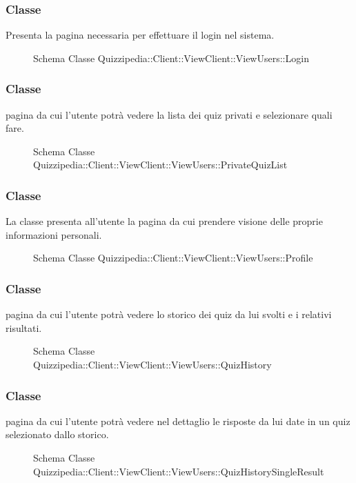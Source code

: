 \subsubsection{Classe }
Presenta la pagina necessaria per effettuare il login nel sistema.
\begin{figure}[H]
\centering
\noindent{}
\caption[Schema Classe Login]{Schema Classe Quizzipedia::Client::ViewClient::ViewUsers::Login}
\end{figure}
\subsubsection{Classe }
pagina da cui l'utente potrà vedere la lista dei quiz privati e selezionare quali fare.
\begin{figure}[H]
\centering
\noindent{}
\caption[Schema Classe PrivateQuizList]{Schema Classe Quizzipedia::Client::ViewClient::ViewUsers::PrivateQuizList}
\end{figure}
\subsubsection{Classe }
La classe presenta all'utente la pagina da cui prendere visione delle proprie informazioni personali.
\begin{figure}[H]
\centering
\noindent{}
\caption[Schema Classe Profile]{Schema Classe Quizzipedia::Client::ViewClient::ViewUsers::Profile}
\end{figure}
\subsubsection{Classe }
pagina da cui l'utente potrà vedere lo storico dei quiz da lui svolti e i relativi risultati.
\begin{figure}[H]
\centering
\noindent{}
\caption[Schema Classe QuizHistory]{Schema Classe Quizzipedia::Client::ViewClient::ViewUsers::QuizHistory}
\end{figure}
\subsubsection{Classe }
pagina da cui l'utente potrà vedere nel dettaglio le risposte da lui date in un quiz selezionato dallo storico.
\begin{figure}[H]
\centering
\noindent{}
\caption[Schema Classe QuizHistorySingleResult]{Schema Classe Quizzipedia::Client::ViewClient::ViewUsers::QuizHistorySingleResult}
\end{figure}
